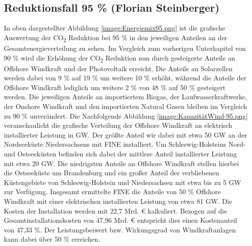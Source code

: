 \newpage
\subsection{Reduktionsfall 95 \% (Florian Steinberger)}


In oben dargestellter Abbildung \ref{image:Energiemix95.png} ist die grafische Auswertung der CO\textsubscript{2} Reduktion bei 95 \% in den jeweiligen Anteilen an der Gesamtenergieverteilung zu sehen. Im Vergleich zum vorherigen Unterkapitel von 90 \% wird die Erhöhung der CO\textsubscript{2} Reduktion nun durch gesteigerte Anteile an Offshore Windkraft und der Photovoltaik erreicht. Die Anteile an Solarzellen werden dabei von 9 \% auf 19 \% um weitere 10 \% erhöht, während die Anteile der Offshore Windkraft lediglich um weitere 2 \% von 48 \% auf 50 \% gesteigert werden. Die jeweiligen Anteile an importiertem Biogas, der Laufwasserkraftwerke, der Onshore Windkraft und den importierten Natural Gasen bleiben im Vergleich zu 90 \% unverändert. Die Nachfolgende Abbildung \ref{image:KapazitätWind-95.png} veranschaulicht die grafische Verteilung der Offshore Windkraft an elektrisch installierter Leistung in GW. Der größte Anteil wir dabei mit etwa 50 GW an der Nordseeküste Niedersachsens mit FINE installiert. Um Schleswig-Holsteins Nord- und Ostseeküsten befinden sich dabei der mittlere Anteil installierter Leistung mit etwa 20 GW. Die niedrigsten Anteile an Offshore Windkraft stellen hierbei die Ostseeküste um Brandenburg und ein großer Anteil der verbliebenen Küstengebiete von Schleswig-Holstein und Niedersachsen mit etwa bis zu 5 GW zur Verfügung. Insgesamt ermittelte FINE die Anteile von 50 \% Offshore Windkraft mit einer elektrischen installierten Leistung von etwa 81 GW. Die Kosten der Installation werden mit 22,7 Mrd. € kalkuliert. Bezogen auf die Gesamtinstallationskosten von 47,96 Mrd. € entspricht dies einen Kostenanteil von 47,33 \%. Der Leistungsbeiwert bzw. Wirkungsgrad von Windkraftanlagen kann dabei über 50 \% erreichen. \cite{ag_2021} 


